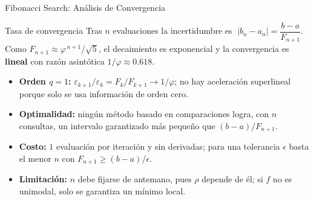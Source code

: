 \begin{frame}{Fibonacci Search: Análisis de Convergencia}
    \begin{alertblock}{Tasa de convergencia}
        \small
        Tras $n$ evaluaciones la incertidumbre es
        $\;|b_n-a_n| = \dfrac{b-a}{F_{n+1}}$.
        Como $F_{n+1}\approx \varphi^{\,n+1}/\sqrt{5}$, el decaimiento es exponencial
        y la convergencia es \textbf{lineal} con razón asintótica
        $1/\varphi \approx 0.618$.
    \end{alertblock}

    \footnotesize
    \begin{itemize}
        \item \textbf{Orden $q=1$:} $\varepsilon_{k+1}/\varepsilon_k = F_{k}/F_{k+1} \to 1/\varphi$;
              no hay aceleración superlineal porque solo se usa información de orden cero.
        \item \textbf{Optimalidad:} ningún método basado en comparaciones logra, con $n$
              consultas, un intervalo garantizado más pequeño que $(b-a)/F_{n+1}$.
        \item \textbf{Costo:} $1$ evaluación por iteración y sin derivadas; para una
              tolerancia $\epsilon$ basta el menor $n$ con $F_{n+1}\ge (b-a)/\epsilon$.
        \item \textbf{Limitación:} $n$ debe fijarse de antemano, pues $\rho$ depende de
              él; si $f$ no es unimodal, solo se garantiza un mínimo local.
    \end{itemize}
\end{frame}
